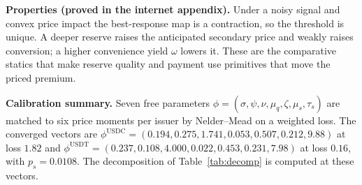 \documentclass[12pt]{article}
\begin{document}
\textbf{Properties (proved in the internet appendix).} Under a noisy signal and convex price impact the best-response map is a contraction, so the threshold is unique. A deeper reserve raises the anticipated secondary price and weakly raises conversion; a higher convenience yield $\omega$ lowers it. These are the comparative statics that make reserve quality and payment use primitives that move the priced premium.

\textbf{Calibration summary.} Seven free parameters $\phi=(\sigma,\psi,\nu,\mu_q,\zeta,\mu_s,\tau_s)$ are matched to six price moments per issuer by Nelder--Mead on a weighted loss. The converged vectors are $\phi^{\text{USDC}}=(0.194,0.275,1.741,0.053,0.507,0.212,9.88)$ at loss $1.82$ and $\phi^{\text{USDT}}=(0.237,0.108,4.000,0.022,0.453,0.231,7.98)$ at loss $0.16$, with $p_s=0.0108$. The decomposition of Table~\ref{tab:decomp} is computed at these vectors.
\end{document}
